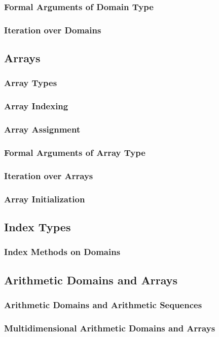 \documentclass[10pt,twoside,titlepage]{article}
\begin{document}
\subsubsection{Formal Arguments of Domain Type}
\subsubsection{Iteration over Domains}
\subsection{Arrays}
\subsubsection{Array Types}
\subsubsection{Array Indexing}
\subsubsection{Array Assignment}
\subsubsection{Formal Arguments of Array Type}
\subsubsection{Iteration over Arrays}
\subsubsection{Array Initialization}
\subsection{Index Types}
\subsubsection{Index Methods on Domains}
\subsection{Arithmetic Domains and Arrays}
\subsubsection{Arithmetic Domains and Arithmetic Sequences}
\subsubsection{Multidimensional Arithmetic Domains and Arrays}
\end{document}
